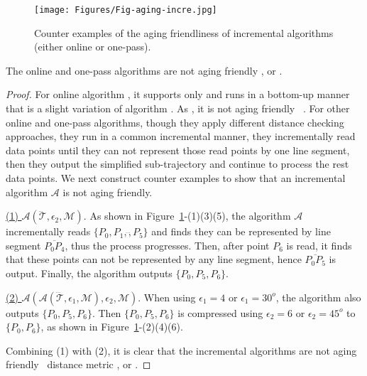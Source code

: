 	
\begin{figure}[tb!]
	\centering
	\texttt{[image: Figures/Fig-aging-incre.jpg]}
	\vspace{-1ex}
	\caption{\small Counter examples of the aging friendliness of incremental algorithms (either online or one-pass).}
	\vspace{-1ex}
	\label{fig:aging-incre}
\end{figure}

\begin{proposition}
	\label{theo-aging-online}
	The online and one-pass algorithms are not aging friendly \wrt \ped, \sed or \dad.

\end{proposition}

\begin{proof}
	For online algorithm \squishe, it supports \sed only and runs in a bottom-up manner that is a slight variation of algorithm \tpa. As \tpa, it is not aging friendly \wrt~\sed.
	For other online and one-pass algorithms, though they apply different distance checking approaches, they run in a common incremental manner, \ie they incrementally read data points until they can not represent those read points by one line segment, then they output the simplified sub-trajectory and continue to process the rest data points. We next construct counter examples to show that an incremental algorithm $\mathcal{A}$ is not aging friendly.
	
	\underline{(1) ${\mathcal{A}}(\dddot{\mathcal{T}}, \epsilon_2, \mathcal{M})$}. As shown in Figure~\ref{fig:aging-incre}-(1)(3)(5), the algorithm $\mathcal{A}$ incrementally reads $\{P_0, P_1,\dddot, P_5\}$ and finds they can be represented by line segment $\overline{P_0P_4}$, thus the process progresses. Then, after point $P_6$ is read, it finds that these points can not be represented by any line segment, hence $\overline{P_0P_5}$ is output. Finally, the algorithm outputs $\{P_0, P_5, P_6\}$.
	
	\underline{(2) ${\mathcal{A}}(\mathcal{A}(\dddot{\mathcal{T}}, \epsilon_1, \mathcal{M}), \epsilon_2, \mathcal{M})$}. When using $\epsilon_1=4$ or $\epsilon_1=30^o $, the algorithm also outputs $\{P_0, P_5, P_6\}$. Then $\{P_0, P_5, P_6\}$ is compressed using $\epsilon_2=6$ or $\epsilon_2=45^o$ to $\{P_0, P_6\}$, as shown in Figure~\ref{fig:aging-incre}-(2)(4)(6).
	
	Combining (1) with (2), it is clear that the incremental algorithms are not aging friendly \wrt~distance metric \ped, \sed or \dad.
\end{proof}


